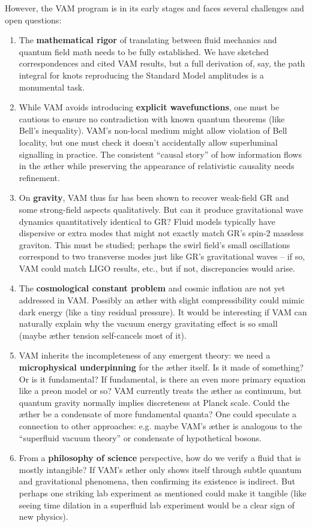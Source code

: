 \documentclass[preprint]{revtex4-2}
\begin{document}
    However, the VAM program is in its early stages and faces several challenges and open questions:
    \begin{enumerate}
        \item The \textbf{mathematical rigor} of translating between fluid mechanics and quantum field math needs to be fully established. We have sketched correspondences and cited VAM results, but a full derivation of, say, the path integral for knots reproducing the Standard Model amplitudes is a monumental task.
        \item While VAM avoids introducing \textbf{explicit wavefunctions}, one must be cautious to ensure no contradiction with known quantum theorems (like Bell’s inequality). VAM’s non-local medium might allow violation of Bell locality, but one must check it doesn’t accidentally allow superluminal signalling in practice. The consistent “causal story” of how information flows in the æther while preserving the appearance of relativistic causality needs refinement.
        \item On \textbf{gravity}, VAM thus far has been shown to recover weak-field GR and some strong-field aspects qualitatively. But can it produce gravitational wave dynamics quantitatively identical to GR? Fluid models typically have dispersive or extra modes that might not exactly match GR’s spin-2 massless graviton. This must be studied; perhaps the swirl field’s small oscillations correspond to two transverse modes just like GR’s gravitational waves – if so, VAM could match LIGO results, etc., but if not, discrepancies would arise.
        \item The \textbf{cosmological constant problem} and cosmic inflation are not yet addressed in VAM. Possibly an æther with slight compressibility could mimic dark energy (like a tiny residual pressure). It would be interesting if VAM can naturally explain why the vacuum energy gravitating effect is so small (maybe æther tension self-cancels most of it).
        \item VAM inherits the incompleteness of any emergent theory: we need a \textbf{microphysical underpinning} for the æther itself. Is it made of something? Or is it fundamental? If fundamental, is there an even more primary equation like a preon model or so? VAM currently treats the æther as continuum, but quantum gravity normally implies discreteness at Planck scale. Could the æther be a condensate of more fundamental quanta? One could speculate a connection to other approaches: e.g. maybe VAM’s æther is analogous to the “superfluid vacuum theory” or condensate of hypothetical bosons.
        \item From a \textbf{philosophy of science} perspective, how do we verify a fluid that is mostly intangible? If VAM’s æther only shows itself through subtle quantum and gravitational phenomena, then confirming its existence is indirect. But perhaps one striking lab experiment as mentioned could make it tangible (like seeing time dilation in a superfluid lab experiment would be a clear sign of new physics).
    \end{enumerate}
\end{document}
